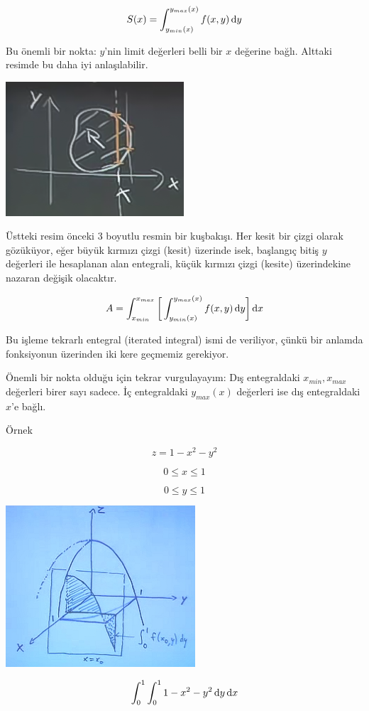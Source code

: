 \documentclass[12pt,fleqn]{article}\usepackage{../../common}
\begin{document}
$$ S(x) = \int_{y_{min}(x)}^{y_{max}(x)} f(x,y) \,\mathrm{d} y $$

Bu önemli bir nokta: $y$'nin limit değerleri belli bir $x$ değerine
bağlı. Alttaki resimde bu daha iyi anlaşılabilir.

\begin{center}
\includegraphics[height=5cm]{16_7.png}
\end{center}

Üstteki resim önceki 3 boyutlu resmin bir kuşbakışı. Her kesit bir çizgi olarak
gözüküyor, eğer büyük kırmızı çizgi (kesit) üzerinde isek, başlangıç bitiş $y$
değerleri ile hesaplanan alan entegrali, küçük kırmızı çizgi (kesite)
üzerindekine nazaran değişik olacaktır.

$$ A = \int_{x_{min}}^{x_{max}} 
\bigg[ 
\int_{y_{min}(x)}^{y_{max}(x)} f(x,y) \,\mathrm{d} y 
\bigg] \,\mathrm{d} x
$$

Bu işleme tekrarlı entegral (iterated integral) ismi de veriliyor, çünkü
bir anlamda fonksiyonun üzerinden iki kere geçmemiz gerekiyor. 

Önemli bir nokta olduğu için tekrar vurgulayayım: Dış entegraldaki $x_{min},
x_{max}$ değerleri birer sayı sadece. İç entegraldaki $y_{max}(x)$ değerleri ise
dış entegraldaki $x$'e bağlı.

Örnek

$$ z = 1 - x^2 - y^2 $$

$$ 0 \le x \le 1 $$

$$ 0 \le y \le 1 $$
\begin{center}
\includegraphics[height=6cm]{16_8.png}
\end{center}
$$ \int_0^1 \int_0^1  1-x^2-y^2 \,\mathrm{d} y \,\mathrm{d} x $$
\end{document}
